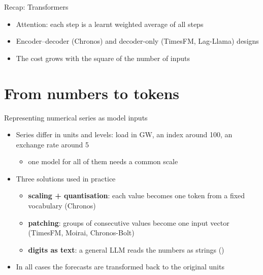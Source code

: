 \begin{frame}{Recap: Transformers}
\itemsize{\small}
\begin{itemize}
    \item Attention: each step is a learnt weighted average of all steps
    \item Encoder--decoder (Chronos) and decoder-only (TimesFM, Lag-Llama) designs
    \item The cost grows with the square of the number of inputs
\end{itemize}
\end{frame}


\section{From numbers to tokens}

\begin{frame}{Representing numerical series as model inputs}
\itemsize{\small}
\begin{itemize}
    \item Series differ in units and levels: load in GW, an index around 100, an exchange rate around 5
    \begin{itemize}
        \item one model for all of them needs a common scale
    \end{itemize}
    \item Three solutions used in practice
    \begin{itemize}
        \item \textbf{scaling + quantisation}: each value becomes one token from a fixed vocabulary (Chronos)
        \item \textbf{patching}: groups of consecutive values become one input vector (TimesFM, Moirai, Chronos-Bolt)
        \item \textbf{digits as text}: a general LLM reads the numbers as strings ()
    \end{itemize}
    \item In all cases the forecasts are transformed back to the original units
\end{itemize}
\end{frame}

